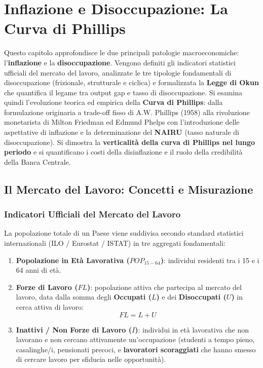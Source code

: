 \chapter{Inflazione e Disoccupazione: La Curva di Phillips}
\label{chap:inflazione_disoccupazione}

\begin{tcolorbox}[colback=navyblue!5!white, colframe=navyblue, title=\textbf{Quadro Concettuale del Capitolo}]
Questo capitolo approfondisce le due principali patologie macroeconomiche: l'\textbf{inflazione} e la \textbf{disoccupazione}. Vengono definiti gli indicatori statistici ufficiali del mercato del lavoro, analizzate le tre tipologie fondamentali di disoccupazione (frizionale, strutturale e ciclica) e formalizzata la \textbf{Legge di Okun} che quantifica il legame tra output gap e tasso di disoccupazione. Si esamina quindi l'evoluzione teorica ed empirica della \textbf{Curva di Phillips}: dalla formulazione originaria a trade-off fisso di A.W. Phillips (1958) alla rivoluzione monetarista di Milton Friedman ed Edmund Phelps con l'introduzione delle aspettative di inflazione e la determinazione del \textbf{NAIRU} (tasso naturale di disoccupazione). Si dimostra la \textbf{verticalità della curva di Phillips nel lungo periodo} e si quantificano i costi della disinflazione e il ruolo della credibilità della Banca Centrale.
\end{tcolorbox}

\section{Il Mercato del Lavoro: Concetti e Misurazione}

\subsection{Indicatori Ufficiali del Mercato del Lavoro}
La popolazione totale di un Paese viene suddivisa secondo standard statistici internazionali (ILO / Eurostat / ISTAT) in tre aggregati fondamentali:
\begin{enumerate}
    \item \textbf{Popolazione in Età Lavorativa ($POP_{15-64}$)}: individui residenti tra i 15 e i 64 anni di età.
    \item \textbf{Forze di Lavoro ($FL$)}: popolazione attiva che partecipa al mercato del lavoro, data dalla somma degli \textbf{Occupati ($L$)} e dei \textbf{Disoccupati ($U$)} in cerca attiva di lavoro:
    \begin{equation}
        FL = L + U
    \end{equation}
    \item \textbf{Inattivi / Non Forze di Lavoro ($I$)}: individui in età lavorativa che non lavorano e non cercano attivamente un'occupazione (studenti a tempo pieno, casalinghe/i, pensionati precoci, e \textbf{lavoratori scoraggiati} che hanno smesso di cercare lavoro per sfiducia nelle opportunità).
\end{enumerate}

